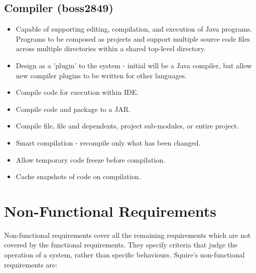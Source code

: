 \documentclass[11pt]{report}
\begin{document}
    \subsection{Compiler (boss2849)}
        \begin{itemize}
            \item Capable of supporting editing, compilation, and execution of Java programs. Programs to be composed as projects and support multiple source code files across multiple directories within a shared top-level directory.
            \item Design as a 'plugin' to the system - initial will be a Java compiler, but allow new compiler plugins to be written for other languages.
            \item Compile code for execution within IDE.
            \item Compile code and package to a JAR.
            \item Compile file, file and dependents, project sub-modules, or entire project.
            \item Smart compilation - recompile only what has been changed. 
            \item Allow temporary code freeze before compilation.
            \item Cache snapshots of code on compilation. 
        \end{itemize}
    
\section{Non-Functional Requirements}
    Non-functional requirements cover all the remaining requirements which are not covered by the functional requirements. They specify criteria that judge the operation of a system, rather than specific behaviours. Squire's non-functional requirements are:
    
\end{document}

